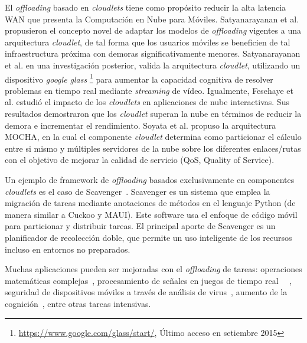 
El \emph{offloading} basado en \emph{cloudlets} tiene como propósito reducir la alta latencia WAN que presenta la Computación en Nube para Móviles.
Satyanarayanan et al. \cite{5280678} propusieron el concepto novel de adaptar los modelos de \emph{offloading} vigentes a una arquitectura 
\emph{cloudlet}, de tal forma que los usuarios móviles se beneficien de tal infraestructura próxima con demoras significativamente menores.
Satyanarayanan et al. \cite{7026272} en una investigación posterior, valida la arquitectura \emph{cloudlet}, utilizando un dispositivo 
\emph{google glass} \footnote{\url{https://www.google.com/glass/start/}, Último acceso en setiembre 2015}
para aumentar la capacidad cognitiva de resolver problemas en tiempo real mediante \emph{streaming} de vídeo. Igualmente, Fesehaye et al. \cite{6337243}
estudió el impacto de los \emph{cloudlets} en aplicaciones de nube interactivas. Sus resultados demostraron que los \emph{cloudlet} superan
la nube en términos de reducir la demora e incrementar el rendimiento. Soyata et al. \cite{6249269} propuso la arquitectura MOCHA, en la cual 
el componente \emph{cloudlet} determina como particionar el cálculo entre si mismo y múltiples servidores de la nube sobre los diferentes 
enlaces/rutas con el objetivo de mejorar la calidad de servicio (QoS, Quality of Service). 

Un ejemplo de framework de \emph{offloading} basados exclusivamente en componentes \emph{cloudlets} es el caso de Scavenger~\cite{5466972}. 
Scavenger es un sistema que emplea la migración de tareas mediante anotaciones de métodos en el lenguaje Python (de manera similar a Cuckoo y 
MAUI). Este software usa el enfoque de código móvil para particionar y distribuir tareas. El principal aporte de Scavenger es un planificador 
de recolección doble, que permite un uso inteligente de los recursos incluso en entornos no preparados. 

Muchas aplicaciones pueden ser mejoradas con el \emph{offloading} de tareas: operaciones matemáticas complejas~\cite{shivarudrappa2011cofa}, 
procesamiento de señales en juegos de tiempo real ~\cite{Cuervo:2010:MMS:1814433.1814441}~\cite{kemp2012cuckoo}, seguridad de dispositivos
móviles a través de análisis de virus~\cite{DBLP:journals/corr/abs-1105-3232}, aumento de la cognición~\cite{7026272}, entre otras tareas
intensivas. 


